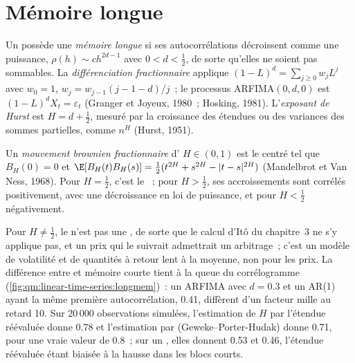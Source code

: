 \section{Mémoire longue}

\begin{definition}\label{def:qm:linear-time-series:longmem}
Un  possède une \emph{mémoire longue} si ses autocorrélations décroissent comme une puissance, $\rho(h) \sim ch^{2d-1}$ avec $0 < d < \frac12$, de sorte
qu'elles ne soient pas sommables. La \emph{différenciation fractionnaire} applique $(1 - L)^d = \sum_{j \ge 0}w_jL^j$ avec $w_0 = 1$, $w_j = w_{j-1}(j - 1 -
d)/j$~; le processus ARFIMA$(0, d, 0)$ est $(1 - L)^dX_t = \varepsilon_t$ (Granger et Joyeux, 1980~; Hosking, 1981). L'\emph{exposant de Hurst} est
$H = d + \frac12$, mesuré par la croissance des étendues ou des variances des sommes partielles, comme $n^H$ (Hurst, 1951).
\end{definition}

\begin{definition}\label{def:qm:linear-time-series:fbm}
Un \emph{mouvement brownien fractionnaire} d' $H \in (0, 1)$ est le  centré tel que $B_H(0) = 0$ et
$\E[B_H(t)B_H(s)] = \frac12(t^{2H} + s^{2H} - |t - s|^{2H})$ (Mandelbrot et Van Ness, 1968). Pour $H = \frac12$, c'est le ~; pour $H > \frac12$, ses accroissements
sont corrélés positivement, avec une décroissance en loi de puissance, et pour $H < \frac12$ négativement.
\end{definition}

Pour $H \ne \frac12$, le  n'est pas une , de sorte que le calcul d'Itô du chapitre~3 ne s'y applique pas, et un prix qui le suivrait
admettrait un arbitrage~; c'est un modèle de volatilité et de quantités à retour lent à la moyenne, non pour les prix. La différence entre  et mémoire
courte tient à la queue du corrélogramme (\cref{fig:qm:linear-time-series:longmem})~: un ARFIMA avec $d = 0.3$ et un AR(1) ayant la même première
autocorrélation, 0.41, diffèrent d'un facteur mille au retard 10. Sur 20\,000 observations simulées, l'estimation de $H$ par l'étendue réévaluée donne 0.78 et
l'estimation par  (Geweke--Porter-Hudak) donne 0.71, pour une vraie valeur de 0.8~; sur un , elles donnent 0.53 et 0.46, l'étendue réévaluée étant biaisée à la hausse dans
les blocs courts.

